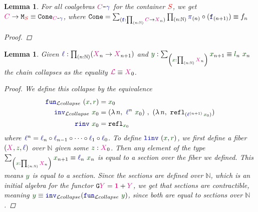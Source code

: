 \documentclass[twoside,11pt,openright]{report}
\theoremstyle{plain} %
\newtheorem{lem}[thm]{Lemma}
\theoremstyle{definition}
\theoremstyle{remark}
\newcommand*{\term}[1]{\textcolor{green!30!black}{#1}} %
\newcommand*{\pathterm}[1]{\textcolor{green!40!black}{#1}}
\newcommand*{\type}[1]{\textcolor{magenta!90!black}{#1}}
\newcommand*{\container}[1]{\textcolor{red}{#1}}
\newcommand*{\unit}{\type{\textbf{1}}}
\newcommand*{\coalg}[2]{#1\texttt{-}#2}
\newcommand*{\function}[1]{\textcolor{blue!60!black}{\ensuremath{\mathtt{#1}}}}
\newcommand*{\typeformer}[1]{\ensuremath{\mathtt{#1}}}
\newcommand*{\functor}[1]{\ensuremath{\mathbf{\mathtt{#1}}}}
\begin{document}
\begin{lem}\label{lem:function-to-M-type-is-cone}
  For all coalgebras \(\coalg{\type{C}}{\function{\gamma}}\) for the container \(\container{S}\), we get \(\type{C} \rightarrow \typeformer{M}_{\container{S}} \equiv \typeformer{Cone}_{\coalg{\type{C}}{\function{\gamma}}}\), where \(\typeformer{Cone} = \sum_{(\function{f} : \prod_{(n : \mathbb{N})} \type{C} \rightarrow \type{X}_n)} \prod_{(n : \mathbb{N})} \function{\pi}_{(n)} \circ (\function{f}_{(n+1)}) \equiv f_n\)
  \begin{proof}
  \end{proof}
\end{lem}
\begin{lem}\label{lem:limit-collapse}
  Given \(\function{\ell} : \prod_{(n : \mathbb{N})} (\type{X}_{n} \rightarrow \type{X}_{n+1})\) and \(\term{y} : \sum_{\left(\term{x} : \prod_{(n : \mathbb{N})} \type{X}_n\right)} \term{x}_{n + 1} \equiv \term{l}_n~\term{x}_n\) the chain collapses as the equality \(\type{\mathcal{L}} \equiv \type{X}_0\).
  \begin{proof}
    We define this collapse by the equivalence
    \begin{align}
      \function{fun}_{\mathcal{L}collapse}~(\term{x} , \pathterm{r}) &= \term{x}_0 \\
      \function{inv}_{\mathcal{L}collapse}~\term{x}_0 &= (\lambda\,n,~\function{\ell}^n~\term{x}_0)~,~(\lambda\,n,~\mathtt{refl}_{(\function{\ell}^{(n+1)}\,\term{x}_0)}) \\
      \function{rinv}~\term{x}_0 &= \mathtt{refl}_{\term{x}_0}
    \end{align}
    where \(\function{\ell}^n = \function{\ell}_n \circ \function{\ell}_{n-1} \circ \dots \circ \function{\ell}_1 \circ \function{\ell}_0\). To define \(\function{linv}~(\term{x} , \pathterm{r})\), we first define a fiber \((\type{X} , \term{z}, \function{\ell})\) over \(\mathbb{N}\) given some \(\term{z} : \type{X}_0\). Then any element of the type \(\sum_{\left(\term{x} : \prod_{(n : \mathbb{N})} \type{X}_n\right)} \term{x}_{n + 1} \equiv \function{\ell}_n~\term{x}_n\) is equal to a section over the fiber we defined. This means \(\term{y}\) is equal to a section. Since the sections are defined over \(\mathbb{N}\), which is an initial algebra for the functor \(\functor{G}\type{Y} = \unit + \type{Y}\), we get that sections are contractible, meaning \(\term{y} \equiv \function{inv}_{\mathcal{L}collapse} (\function{fun}_{\mathcal{L}collapse}~\term{y})\), since both are equal to sections over \(\mathbb{N}\).
\end{proof}
\end{lem}
\end{document}
